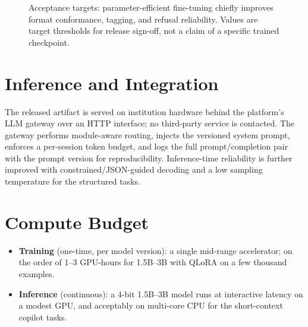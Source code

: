 \documentclass[11pt,a4paper]{article}
\begin{document}
\begin{figure}[h]
\centering
{}
\caption{Acceptance targets: parameter-efficient fine-tuning chiefly improves format conformance, tagging, and refusal reliability. Values are target thresholds for release sign-off, not a claim of a specific trained checkpoint.}
\end{figure}

\section{Inference and Integration}
The released artifact is served on institution hardware behind the platform's
LLM gateway over an HTTP interface; no third-party service is contacted. The
gateway performs module-aware routing, injects the versioned system prompt,
enforces a per-session token budget, and logs the full prompt/completion pair
with the prompt version for reproducibility. Inference-time reliability is
further improved with constrained/JSON-guided decoding and a low sampling
temperature for the structured tasks.

\section{Compute Budget}
\begin{itemize}[leftmargin=*]
  \item \textbf{Training} (one-time, per model version): a single mid-range
        accelerator; on the order of 1--3 GPU-hours for 1.5B--3B with QLoRA on
        a few thousand examples.
  \item \textbf{Inference} (continuous): a 4-bit 1.5B--3B model runs at
        interactive latency on a modest GPU, and acceptably on multi-core CPU
        for the short-context copilot tasks.
\end{itemize}
\end{document}
